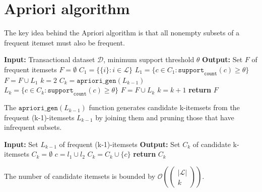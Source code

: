 \documentclass[12pt, openany]{report}
\theoremstyle{definition}
\begin{document}
\section{Apriori algorithm}
The key idea behind the Apriori algorithm is that all nonempty subsets of a frequent itemset must also be frequent. 
\begin{algorithm}[H]
    \caption{Apriori algorithm}
    \begin{algorithmic}[1]
        \State \textbf{Input:} Transactional dataset $\mathcal{D}$, minimum support threshold $\theta$
        \State \textbf{Output:} Set $F$ of frequent itemsets
        \State $F = \emptyset$
        \State $C_1 = \{\{i\}: i \in \mathcal{L}\}$
        \State $L_1 = \{c \in C_1: \texttt{support}_\texttt{count}(c) \geq \theta\}$
        \State $F = F \cup L_1$
        \State $k = 2$
            \State $C_k = \texttt{apriori\_gen}(L_{k-1})$
            \State $L_k = \{c \in C_k: \texttt{support}_\texttt{count}(c) \geq \theta\}$
            \State $F = F \cup L_k$
            \State $k = k + 1$
        \EndWhile
        \State \textbf{return} $F$
    \end{algorithmic}
\end{algorithm}
\newpage
The $\texttt{apriori\_gen}(L_{k-1})$ function generates candidate k-itemsets from the frequent (k-1)-itemsets $L_{k-1}$ by joining them and pruning those that have infrequent subsets.
\begin{algorithm}[H]
    \caption{apriori\_gen($L_{k-1}$)}
    \begin{algorithmic}[1]
        \State \textbf{Input:} Set $L_{k-1}$ of frequent (k-1)-itemsets
        \State \textbf{Output:} Set $C_k$ of candidate k-itemsets
        \State $C_k = \emptyset$
                    \State $c = l_1 \cup l_2$
                        \State $C_k = C_k \cup \{c\}$
                    \EndIf
                \EndIf
            \EndFor
        \EndFor
        \State \textbf{return} $C_k$
    \end{algorithmic}
\end{algorithm}
The number of candidate itemsets is bounded by $\mathcal{O}\left(\begin{pmatrix}|\mathcal{L}| \\ k \end{pmatrix}\right)$.\\
\end{document}
